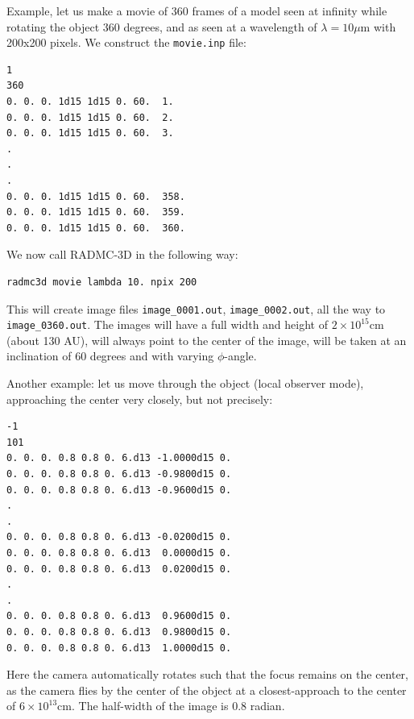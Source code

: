 \documentclass{report}
\newenvironment{asciibox}%
  {\begin{list}{}{%
    \setlength{\topsep}{0.5em}%
    \setlength{\parskip}{0em}%
    \setlength{\parsep}{0em}%
    \setlength{\itemsep}{0em}%
    \setlength{\rightmargin}{0em}%
    \setlength{\leftmargin}{3.0em}%
    \setlength{\labelsep}{1em}%
    \setlength{\labelwidth}{2em}%
  }\normalfont\footnotesize\item}
  {\end{list}}
\begin{document}
Example, let us make a movie of 360 frames of a model seen at infinity while
rotating the object 360 degrees, and as seen at a wavelength of
$\lambda=10\mu$m with 200x200 pixels. We construct the {\small\tt movie.inp}
file:
\begin{asciibox}\begin{verbatim}
1
360
0. 0. 0. 1d15 1d15 0. 60.  1.
0. 0. 0. 1d15 1d15 0. 60.  2.
0. 0. 0. 1d15 1d15 0. 60.  3.
.
.
.
0. 0. 0. 1d15 1d15 0. 60.  358.
0. 0. 0. 1d15 1d15 0. 60.  359.
0. 0. 0. 1d15 1d15 0. 60.  360.
\end{verbatim}\end{asciibox}
We now call RADMC-3D in the following way:
{\small\begin{verbatim}
radmc3d movie lambda 10. npix 200
\end{verbatim}}
This will create image files {\small\tt image\_0001.out}, 
{\small\tt image\_0002.out},
all the way to {\small\tt image\_0360.out}.
The images will have a full width and height of $2\times 10^{15}$cm (about
130 AU), will always point to the center of the image, will be taken at an
inclination of 60 degrees and with varying $\phi$-angle.

Another example: let us move through the object (local observer mode),
approaching the center very closely, but not precisely:
\begin{asciibox}\begin{verbatim}
-1
101
0. 0. 0. 0.8 0.8 0. 6.d13 -1.0000d15 0.
0. 0. 0. 0.8 0.8 0. 6.d13 -0.9800d15 0.
0. 0. 0. 0.8 0.8 0. 6.d13 -0.9600d15 0.
.
.
0. 0. 0. 0.8 0.8 0. 6.d13 -0.0200d15 0.
0. 0. 0. 0.8 0.8 0. 6.d13  0.0000d15 0.
0. 0. 0. 0.8 0.8 0. 6.d13  0.0200d15 0.
.
.
0. 0. 0. 0.8 0.8 0. 6.d13  0.9600d15 0.
0. 0. 0. 0.8 0.8 0. 6.d13  0.9800d15 0.
0. 0. 0. 0.8 0.8 0. 6.d13  1.0000d15 0.
\end{verbatim}\end{asciibox}
Here the camera automatically rotates such that the focus remains on the
center, as the camera flies by the center of the object at a
closest-approach to the center of $6\times 10^{13}$cm. The half-width
of the image is 0.8 radian.
\end{document}
